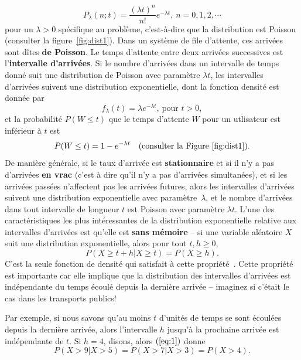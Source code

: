$$ P_{\lambda}(n; t) = \frac{(\lambda t)^n}{n!} e^{-\lambda t}, \ n=0,1,2,\cdots$$
pour un $\lambda>0$ spécifique au problème, c'est-à-dire que la distribution est Poisson (consulter la figure~\ref{fig:dist1}). Dans un système de file d'attente, ces arrivées sont dîtes \textbf{de Poisson}. \newl Le temps d’attente entre deux arrivées successives est l’\textbf{in\-ter\-val\-le d'ar\-ri\-vées}. Si le nombre d'ar\-ri\-vées dans un intervalle de temps donné suit une distribution de Poisson avec paramètre $\lambda t$, les intervalles d’arrivées suivent une distribution exponentielle, dont la fonction densité est donnée par 
$$ f_{\lambda}(t) = \lambda e^{-\lambda t}, \ \textrm{pour  }t>0,$$ et la probabilité $P(W\leq t)$ que le temps d'attente $W$ pour un utlisateur est inférieur à $t$ est 
$$P(W\leq t) = 1 - e^{-\lambda t}\quad \textrm{(consulter la Figure~\ref{fig:dist1})}.$$
De manière générale, si le taux d'arrivée est \textbf{stationnaire} et si il n’y a pas d'arrivées \textbf{en vrac} (c’est à dire qu’il n’y a pas d'arrivées simultanées), et si les arrivées passées n'affectent pas les arrivées futures, alors les intervalles d’arrivées suivent une distribution exponentielle avec paramètre~$\lambda$, et le nombre d'arrivées dans tout intervalle de longueur $t$ est Poisson avec paramètre $\lambda t$.
 \newl L'une des caractéristiques les plus intéressantes de la distribution exponentielle relative aux intervalles d'arrivées est qu'elle est \textbf{sans mémoire} -- si une variable aléatoire $X$ suit une distribution exponentielle, alors pour tout $t,h\geq 0$,
\begin{equation}
P(X \geq t + h|X \geq t) = P(X \geq h). 
\label{eq:1}
\end{equation}
C'est la seule fonction de densité qui satisfait à cette propriété~\cite{QS_R}. Cette propriété est importante car elle implique que la distribution des intervalles d'arrivées est indépendante du temps écoulé depuis la dernière arrivée -- imaginez si c'était le cas dans  les transports publics! \par Par exemple, si nous savons qu'au moins $t$ d'unités de temps se sont écoulées depuis la dernière arrivée, alors l’intervalle $h$ jusqu'à la prochaine arrivée est indépendante de $t$. Si $h=4$, disons, alors $(\ref{eq:1})$ donne 
$$ P(X>9|X>5)= P(X>7|X>3) = P(X>4).$$

